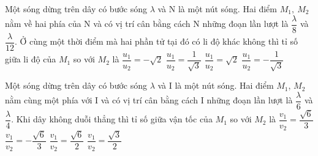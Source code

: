 \begin{vidu}%
Một sóng dừng trên dây có bước sóng $\lambda$ và N là một nút sóng. Hai điểm $M_1,\ M_2$ nằm về hai phía của N và có vị trí cân bằng cách N những đoạn lần lượt là $\dfrac{\lambda }{8}$ và $\dfrac{\lambda }{12}$. Ở cùng một thời điểm mà hai phần tử tại đó có li độ khác không thì tỉ số giữa li độ của $M_1$ so với $M_2$ là
\choice
{\True $\dfrac{u_1}{u_2}=-\sqrt{2}$}
{$\dfrac{u_1}{u_2}=\dfrac{1}{\sqrt{3}}$}
{$\dfrac{u_1}{u_2}=\sqrt{2}$}
{$\dfrac{u_1}{u_2}=-\dfrac{1}{\sqrt{3}}$}
\end{vidu} %
\begin{vidu}%
Một sóng dừng trên dây có bước sóng $\lambda$ và I là một nút sóng. Hai điểm $M_1$, $M_2$ nằm cùng một phía với I và có vị trí cân bằng cách I những đoạn lần lượt là $\dfrac{\lambda }{6}$ và $\dfrac{\lambda }{4}$. Khi dây không duỗi thẳng thì tỉ số giữa vận tốc của $M_1$ so với $M_2$ là
\choice
{$\dfrac{v_1}{v_2}=\dfrac{\sqrt{6}}{3}$}
{$\dfrac{v_1}{v_2}=-\dfrac{\sqrt{6}}{3}$}
{$\dfrac{v_1}{v_2}=\dfrac{\sqrt{6}}{2}$}
{\True $\dfrac{v_1}{v_2}=\dfrac{\sqrt{3}}{2}$}
\end{vidu} %
